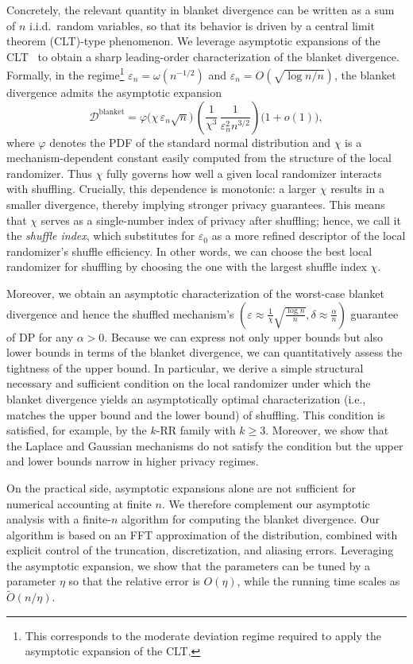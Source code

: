 \documentclass{article}
\theoremstyle{plain}
\theoremstyle{definition}
\begin{document}
Concretely, the relevant quantity in blanket divergence can be written as a sum of $n$ i.i.d.\ random variables, so that its behavior is driven by a central limit theorem (CLT)-type phenomenon.
We leverage asymptotic expansions of the CLT~\cite{petrovSumsIndependentRandom1975} to obtain a sharp leading-order characterization of the blanket divergence.
Formally, in the regime\footnote{This corresponds to the moderate deviation regime required to apply the asymptotic expansion of the CLT.}
$\varepsilon_n = \omega(n^{-1/2})$ and
$\varepsilon_n = O(\sqrt{\log n / n})$, the blanket divergence admits the asymptotic expansion
\[
  \mathcal D^{\mathrm{blanket}}
  =
  \varphi\bigl(\chi\,\varepsilon_n\sqrt{n}\bigr)\,
  \left(
    \frac{1}{\chi^3}\,
    \frac{1}{\varepsilon_n^2 n^{3/2}}
  \right)\bigl(1+o(1)\bigr),
\]
where $\varphi$ denotes the PDF of the standard normal distribution and $\chi$ is a mechanism-dependent constant easily computed from the structure of the local randomizer.
Thus $\chi$ fully governs how well a given local randomizer interacts with
shuffling.
Crucially, this dependence is monotonic: a larger $\chi$ results in a smaller divergence, thereby implying stronger privacy guarantees.
This means that $\chi$ serves as a single-number index of privacy after shuffling; hence, we call it the \emph{shuffle index}, which substitutes for $\varepsilon_0$ as a more refined descriptor of the local randomizer's shuffle efficiency.
In other words, we can choose the best local randomizer for shuffling by choosing the one with the largest shuffle index $\chi$.


Moreover, we obtain an asymptotic characterization of the worst-case blanket divergence and hence the shuffled mechanism's $(\varepsilon\approx\frac{1}{\chi}\sqrt{\frac{\log n}{n}},\delta\approx\tfrac{\alpha}{n})$ guarantee of DP for any $\alpha>0$.
Because we can express not only upper bounds but also lower bounds in terms of the blanket divergence, we can quantitatively assess the tightness of the upper bound.
In particular, we derive a simple structural necessary and sufficient condition on the local randomizer under which the blanket divergence yields an asymptotically optimal characterization (i.e., matches the upper bound and the lower bound) of shuffling.
This condition is satisfied, for example, by the $k$-RR family with $k\geq 3$. 
Moreover, we show that the Laplace and Gaussian mechanisms do not satisfy the condition but the upper and lower bounds narrow in higher privacy regimes.


On the practical side, asymptotic expansions alone are not sufficient for numerical accounting at finite $n$.
We therefore complement our asymptotic analysis with a finite-$n$ algorithm for computing the blanket divergence.
Our algorithm is based on an FFT approximation of the distribution, combined with explicit control of the truncation, discretization, and aliasing errors.
Leveraging the asymptotic expansion, we show that the parameters can be tuned by a parameter $\eta$ so that the relative error is $O(\eta)$, while the running time scales as $\widetilde O(n/\eta)$.
\end{document}
